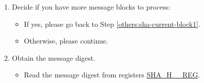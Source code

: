 \begin{enumerate}
    \item Decide if you have more message blocks to process:
    \begin{itemize}
        \item If yes, please go back to Step \ref{others:sha-current-block1}.
        \item Otherwise, please continue.
    \end{itemize}
    
    \item Obtain the message digest.
    \begin{itemize}
        \item Read the message digest from registers \hyperref[regdesc:SHAHNREG]{SHA\_H\_\_REG}.
    \end{itemize}
\end{enumerate}
